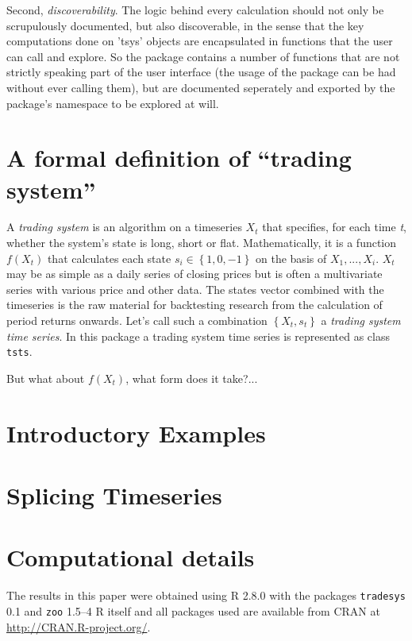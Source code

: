 \documentclass[a4]{article}
\newcommand{\code}[1]{\texttt{#1}}
\begin{document}
Second, \emph{discoverability}. The logic behind every calculation
should not only be scrupulously documented, but also discoverable, in
the sense that the key computations done on 'tsys' objects are
encapsulated in functions that the user can call and explore. So the
package contains a number of functions that are not strictly speaking
part of the user interface (the usage of the package can be had
without ever calling them), but are documented seperately and exported
by the package's namespace to be explored at will.

\section{A formal definition of ``trading system''}
A \emph{trading system} is an algorithm on a timeseries $X_{t}$ that
specifies, for each time \emph{t}, whether the system's state is long,
short or flat. Mathematically, it is a function $f(X_{t})$ that
calculates each state $s_{i} \in \left\{1,0,-1\right\}$ on the basis
of $X_{1}, ..., X_{i}$. $X_{t}$ may be as simple as a daily series of
closing prices but is often a multivariate series with various price
and other data. The states vector combined with the timeseries is the
raw material for backtesting research from the calculation of period
returns onwards. Let's call such a combination $\left\{X_{t},
s_{t}\right\}$ a \emph{trading system time series}. In this package a
trading system time series is represented as class \code{tsts}.

But what about $f(X_{t})$, what form does it take?...

\section{Introductory Examples}

\section{Splicing Timeseries}

\section*{Computational details}
The results in this paper were obtained using R
2.8.0 with the packages
\code{tradesys} 0.1 
and \code{zoo}  1.5--4 R itself
and all packages used are available from CRAN at
\url{http://CRAN.R-project.org/}.
\end{document}
